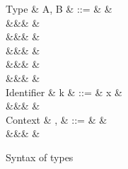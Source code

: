 \begin{figure}[H]
\begin{syntaxfig}
\mbox{Type}
&
A, B
&
::=
&
\tyBool
&
\\
&&&
\tyInt
&
\\
&&&
&
\\
&&&
&
\\
&&&
&
\\
&&&
&
\\[2mm]
\mbox{Identifier}
&
k
&
::=
&
x
&
\\
&&&
\primOp
&
\\[2mm]
\mbox{Context}
&
\Gamma, \Delta
&
::=
&
\cxtEmpty
&
\\
&&&
&
\end{syntaxfig}
\caption{Syntax of types}
\end{figure}
